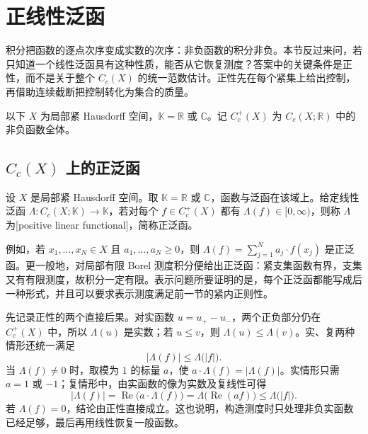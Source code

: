 \section{正线性泛函}
\label{b1:sec:1103}

积分把函数的逐点次序变成实数的次序：非负函数的积分非负。本节反过来问，若只知道一个线性泛函具有这种性质，能否从它恢复测度？答案中的关键条件是正性，而不是关于整个 \(C_c(X)\) 的统一范数估计。正性先在每个紧集上给出控制，再借助连续截断把控制转化为集合的质量。

\ProseParagraphBreak

以下 \(X\) 为局部紧 Hausdorff 空间，\(\mathbb K=\mathbb R\) 或 \(\mathbb C\)。记 \(C_c^+(X)\) 为 \(C_c(X;\mathbb R)\) 中的非负函数全体。

\subsection{\texorpdfstring{\(C_c(X)\)}{Cc(X)} 上的正泛函}
\label{b1:subsec:110301}

\begin{definition}\label{b1:def:positive-functional}
设 \(X\) 是局部紧 Hausdorff 空间。取 \(\mathbb K=\mathbb R\) 或 \(\mathbb C\)，函数与泛函在该域上。给定线性泛函 \(\Lambda:C_c(X;\mathbb K)\rightarrow\mathbb K\)，若对每个 \(f\in C_c^+(X)\) 都有 \(\Lambda(f)\in[0,\infty)\)，则称 \(\Lambda\) 为[positive linear functional]，简称正泛函。
\end{definition}

例如，若 \(x_1,\ldots,x_N\in X\) 且 \(a_1,\ldots,a_N\geq0\)，则 \(\Lambda(f)=\sum_{j=1}^N a_j\cdot f(x_j)\) 是正泛函。更一般地，对局部有限 Borel 测度积分便给出正泛函：紧支集函数有界，支集又有有限测度，故积分一定有限。表示问题所要证明的是，每个正泛函都能写成后一种形式，并且可以要求表示测度满足前一节的紧内正则性。

\ProseParagraphBreak

先记录正性的两个直接后果。对实函数 \(u=u_+-u_-\)，两个正负部分仍在 \(C_c^+(X)\) 中，所以 \(\Lambda(u)\) 是实数；若 \(u\leq v\)，则 \(\Lambda(u)\leq\Lambda(v)\)。实、复两种情形还统一满足
\begin{equation}\label{b1:eq:positive-functional-modulus}
 \bigl|\Lambda(f)\bigr|\leq\Lambda\bigl(|f|\bigr).
\end{equation}
当 \(\Lambda(f)\ne0\) 时，取模为 \(1\) 的标量 \(a\)，使 \(a\cdot \Lambda(f)=|\Lambda(f)|\)。实情形只需 \(a=1\) 或 \(-1\)；复情形中，由实函数的像为实数及复线性可得
\[
 \bigl|\Lambda(f)\bigr|
 =\operatorname{Re}\bigl(a\cdot \Lambda(f)\bigr)
 =\Lambda\bigl(\operatorname{Re}(af)\bigr)
 \leq\Lambda\bigl(|f|\bigr).
\]
若 \(\Lambda(f)=0\)，结论由正性直接成立。这也说明，构造测度时只处理非负实函数已经足够，最后再用线性恢复一般函数。


